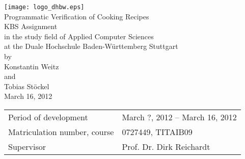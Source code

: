 \begin{titlepage}

  \begin{center}
    \texttt{[image: logo\_dhbw.eps]}\\[3cm]
  
    {\Large Programmatic Verification of Cooking Recipes} \\[1.5cm]
    {\LARGE KBS Assignment} \\[1cm]
    {\large in the study field of Applied Computer Sciences} \\[0.5cm]
    {\large at the Duale Hochschule Baden-Württemberg Stuttgart} \\[1.5cm]
    {\large by} \\[0.5cm]
    {\Large Konstantin Weitz} \\[0.2cm]
    {\large and} \\[0.2cm]
    {\Large Tobias Stöckel} \\[1.75cm]
    {\large March 16, 2012}
    \vfill
    \begin{tabularx}{\textwidth}{ X X }
      Period of development & March ?, 2012 -- March 16, 2012 \\
      Matriculation number, course & 0727449, TITAIB09 \\
      Supervisor & Prof. Dr. Dirk Reichardt \\
    \end{tabularx}
  \end{center}

\end{titlepage}